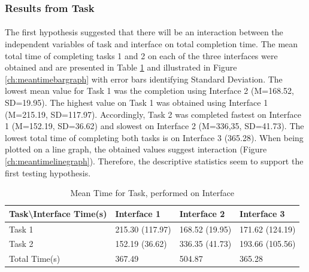 \documentclass{l4proj}
\begin{document}
{\subsubsection{Results from Task}
\paragraph{}
The first hypothesis suggested that there will be an interaction between the independent variables of task and interface on total completion time. The mean total time of completing tasks 1 and 2 on each of the three interfaces were obtained and are presented in Table \ref{tab:timepertaskandinterface} and illustrated in Figure \ref{ch:meantimebargraph} with error bars identifying Standard Deviation. The lowest mean value for Task 1 was the completion using Interface 2 (M=168.52, SD=19.95). The highest value on Task 1 was obtained using Interface 1 (M=215.19, SD=117.97).  Accordingly, Task 2 was completed fastest on Interface 1 (M=152.19, SD=36.62) and slowest on Interface 2 (M=336,35, SD=41.73). The lowest total time of completing both tasks is on Interface 3 (365.28). When being plotted on a line graph, the obtained values suggest interaction (Figure \ref{ch:meantimelinegraph}). Therefore, the descriptive statistics seem to support the first testing hypothesis. 
\begin{table}[H]
	\centering
	\begin{tabular}{|l|l|l|l|} \hline
		Task\textbackslash Interface Time(s)&	Interface 1	& Interface 2 &	Interface 3 \\ \hline
		Task 1 	& 215.30 (117.97)	& 168.52 (19.95)	& 171.62 (124.19)  \\ \hline
		Task 2	& 152.19 (36.62)	& 336.35 (41.73)	& 193.66 (105.56)  \\ \hline
		Total Time(s)	& 367.49 & 	504.87	& 365.28 \\ \hline
	\end{tabular}
		\caption{Mean Time for Task, performed on Interface}
		\label{tab:timepertaskandinterface}
\end{table}


}
\end{document}

